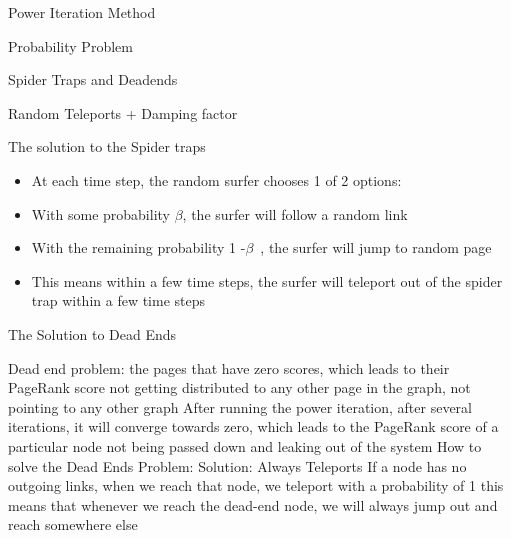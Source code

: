 \documentclass{beamer}
\begin{document}
\begin{frame}[t]{Power Iteration Method}

\end{frame}

\begin{frame}[t]{Probability Problem}

\end{frame}

\begin{frame}[t]{Spider Traps and Deadends}

\end{frame}

\begin{frame}[t]{Random Teleports + Damping factor}
    
\end{frame}

\begin{frame}[t]{The solution to the Spider traps}
    \begin{itemize}
        \item At each time step, the random surfer chooses 1 of 2 options:
        \item With some probability $\beta$, the surfer will follow a random link
        \item With the remaining probability 1 -$\beta$ , the surfer will jump to random page
        \item This means within a few time steps, the surfer will teleport out of the spider trap within a few time steps
    \end{itemize}
\end{frame}
    
\begin{frame}[t]{The Solution to Dead Ends}
\begin{outline}
\1 Dead end problem: the pages that have zero scores, which leads to their PageRank score not getting distributed to any other page in the graph, not pointing to any other graph
\1 After running the power iteration, after several iterations, it will converge towards zero, which leads to the PageRank score of a particular node not being passed down and leaking out of the system
\1 How to solve the Dead Ends Problem:
        \2 Solution: Always Teleports
        \2 If a node has no outgoing links, when we reach that node, we teleport with a probability of 1
        \2 this means that whenever we reach the dead-end node, we will always jump out and reach somewhere else
\end{outline}
\end{frame}
    
\end{document}
